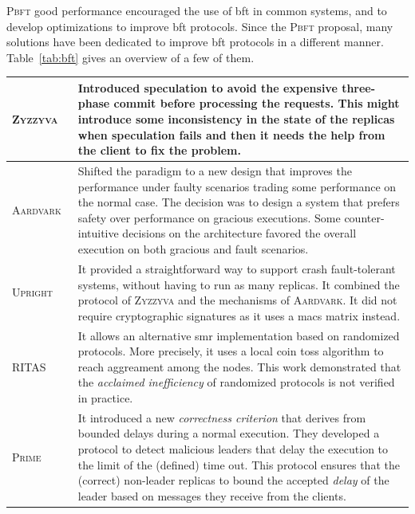 \textsc{Pbft} good performance encouraged the use of \gls{bft} in common systems, and to develop optimizations to improve \gls{bft} protocols. 
Since the \textsc{Pbft} proposal, many solutions have been dedicated to improve \gls{bft} protocols in a different manner. 
Table~\ref{tab:bft} gives an overview of a few of them.


\begin{table}[h]
\begin{center}
{\footnotesize
\begin{tabular}{ p{2.4cm}  p{10.5cm}  }\hline
\textsc{Zyzzyva}~\cite{Kotla:2010}  & Introduced speculation to avoid the expensive three-phase commit before processing the requests. This might introduce some inconsistency in the state of the replicas when speculation fails and then it needs the help from the client to fix the problem. \\ \hline            
\textsc{Aardvark}~\cite{Clement:2009b} & Shifted the paradigm to a new design that improves the performance under faulty scenarios trading some performance on the normal case. The decision was to design a system that prefers safety over performance on gracious executions. Some counter-intuitive decisions on the architecture favored the overall execution on both gracious and fault scenarios. \\ \hline
\textsc{Upright}~\cite{Clement:2009} & It provided a straightforward way to support crash fault-tolerant systems, without having to run as many replicas. It combined the protocol of \textsc{Zyzzyva} and the mechanisms of \textsc{Aardvark}. It did not require cryptographic signatures as it uses a \glspl{mac} matrix instead. \\ \hline    

\textsc{RITAS}~\cite{Moniz:2011} & It allows an alternative \gls{smr} implementation based on randomized protocols. More precisely, it uses a local coin toss algorithm to reach aggreament among the nodes. This work demonstrated that the \emph{acclaimed inefficiency} of randomized protocols is not verified in practice.  \\ \hline

\textsc{Prime}~\cite{Amir:2011} & It introduced a new \emph{correctness criterion} that derives from bounded delays during a normal execution. They developed a protocol to detect malicious leaders that delay the execution to the limit of the (defined) time out. This protocol ensures that the (correct) non-leader replicas to bound the accepted \emph{delay} of the leader based on messages they receive from the clients. \\ \hline


\end{tabular}}
\end{center}
\end{table}
